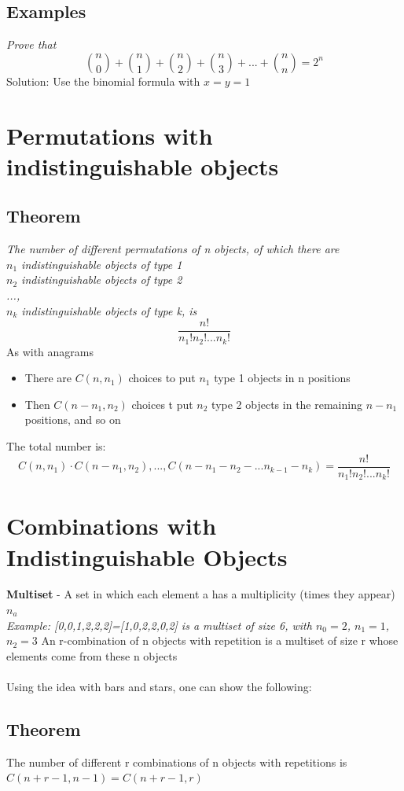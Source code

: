 \documentclass{article}[18pt]
\begin{document}
\subsection{Examples}
\textit{Prove that}
$$\binom{n}{0}+\binom{n}{1}+\binom{n}{2}+	\binom{n}{3}+...+\binom{n}{n}=2^n$$
Solution: Use the binomial formula with $x=y=1$
\section{Permutations with indistinguishable objects}
\subsection{Theorem}
\textit{The number of different permutations of n objects, of which there are\\
$n_1$ indistinguishable objects of type 1\\
$n_2$ indistinguishable objects of type 2\\
...,\\
$n_k$ indistinguishable objects of type k, is
}
$$\dfrac{n!}{n_1!n_2!...n_k!}$$
As with anagrams
\begin{itemize}
\item There are $C(n,n_1)$ choices to put $n_1$ type 1 objects in n positions
\item Then $C(n-n_1,n_2)$ choices t put $n_2$ type 2 objects in the remaining $n-n_1$ positions, and so on
\end{itemize}
The total number is:
$$C(n,n_1)\cdot C(n-n_1,n_2),...,C(n-n_1-n_2-...n_{k-1}-n_k)=\dfrac{n!}{n_1!n_2!...n_k!}$$
\section{Combinations with Indistinguishable Objects}
\textbf{Multiset} - A set in which each element a has a multiplicity (times they appear) $n_a$\\
\textit{Example: [0,0,1,2,2,2]=[1,0,2,2,0,2] is a multiset of size 6, with $n_0=2$, $n_1=1$, $n_2=3$}
An r-combination of n objects with repetition is a multiset of size r whose elements come from these n objects\\
\\
Using the idea with bars and stars, one can show the following:
\subsection{Theorem}
The number of different r combinations of n objects with repetitions is $C(n+r-1,n-1)=C(n+r-1,r)$
\end{document}
